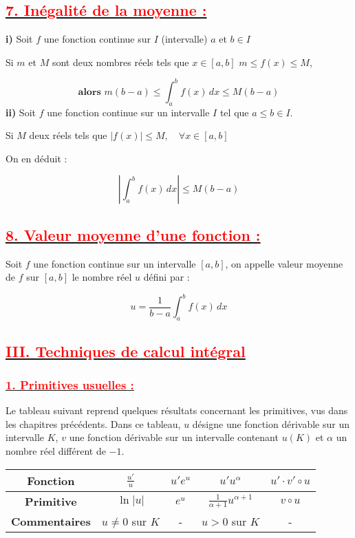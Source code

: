 \documentclass[12pt]{article}
\begin{document}
\subsection*{\underline{\textbf{\textcolor{red}{7. Inégalité de la moyenne :}}}}

\textbf{i)} Soit \( f \) une fonction continue sur \( I \) (intervalle) \( a \) et \( b \in I \)

Si \( m \) et \( M \) sont deux nombres réels tels que \( x \in [a, b] \) \( m \leq f(x) \leq M \),  

\[
\textbf{alors }m (b - a) \leq \int_a^b f(x) \, dx \leq M(b - a)
\]  
\textbf{ii)} Soit \( f \) une fonction continue sur un intervalle \( I \) tel que \( a \leq b \in I \).

Si  \( M \) deux réels tels que \(|f(x)| \leq M, \quad \forall x \in [a,b]\)

On en déduit :

\[
\left| \int_a^b f(x) \, dx \right| \leq M (b-a)
\]

\subsection*{\underline{\textbf{\textcolor{red}{8. Valeur moyenne d'une fonction :}}}}

Soit \( f \) une fonction continue sur un intervalle \( [a, b] \), on appelle valeur moyenne de \( f \) sur \( [a, b] \) le nombre réel \( u \) défini par :

\[
u = \frac{1}{b - a} \int_a^b f(x) \, dx
\]
\subsection*{\underline{\textbf{\textcolor{red}{III. Techniques de calcul intégral}}}}

\subsubsection*{\underline{\textcolor{red}{1. Primitives usuelles :}}}
Le tableau suivant reprend quelques résultats concernant les primitives, vus dans les chapitres précédents. Dans ce tableau, \( u \) désigne une fonction dérivable sur un intervalle \( K \), \( v \) une fonction dérivable sur un intervalle contenant \( u(K) \) et \( \alpha \) un nombre réel différent de \( -1 \).

\begin{tabular}{|c|c|c|c|c|}
\hline
\textbf{Fonction} & \( \frac{u'}{u} \) & \( u' e^u \) & \( u' u^\alpha \) & \( u' \cdot v' \circ u \) \\
\hline
\textbf{Primitive} & \( \ln |u| \) & \( e^u \) & \( \frac{1}{\alpha + 1} u^{\alpha + 1} \) & \( v \circ u \) \\
\hline
\textbf{Commentaires} & \( u \neq 0 \) sur \( K \) & - & \( u > 0 \) sur \( K \) & - \\
\hline
\end{tabular}
\end{document}
